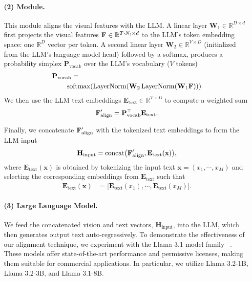 \paragraph{(2) \alignmodule{} Module.}
This module aligns the visual features with the LLM. A linear layer $\mathbf{W}_1 \in \mathbb{R}^{D \times d}$ first projects the visual features $\mathbf{F} \in \mathbb{R}^{T \cdot N_t \times d}$ to the LLM's token embedding space: one $\mathbb{R}^D$ vector per token. A second linear layer $\mathbf{W}_2 \in \mathbb{R}^{V \times D}$ (initialized from the LLM's language-model head) followed by a softmax, produces a probability simplex $\mathbf{P}_\text{vocab}$
over the LLM's vocabulary ($V$ tokens)
\begin{align}
&\mathbf{P}_\text{vocab} = \label{eq:vocab_projection}\\ 
&\qquad\operatorname{softmax}( \operatorname{LayerNorm}(\mathbf{W}_2 \operatorname{LayerNorm}(\mathbf{W}_1 \mathbf{F})))  \nonumber
\end{align}
We then use the LLM text embeddings $\mathbf{E}_\text{text} \in \mathbb{R}^{V \times D}$ to compute a weighted sum
\begin{equation}
\mathbf{F}_\text{align}^\prime = \mathbf{P}_\text{vocab}^\top \mathbf{E}_\text{text}.
\label{eq:feature_alignment}
\end{equation}

Finally, we concatenate $\mathbf{F}_\text{align}^\prime$ with the tokenized text embeddings to form the LLM input
\begin{equation}
\mathbf{H}_\text{input}
= \mathrm{concat}\bigl(\mathbf{F}_\text{align}^\prime, \mathbf{E}_\text{text}(\mathbf{x})\bigr),\nonumber \label{eq:3}
\end{equation}
where $\mathbf{E}_\text{text}(\mathbf{x})$ is obtained by tokenizing the input text $\mathbf{x} = (x_1,\cdots,x_M)$ and selecting the corresponding embeddings from $\mathbf{E}_\text{text}$ such that
\begin{align}
\mathbf{E}_\text{text}(\mathbf{x}) 
& = \bigl[\mathbf{E}_\text{text}(x_1), \cdots, \mathbf{E}_\text{text}(x_M)\bigr].\label{eq:ftext}
\end{align}

\paragraph{(3) Large Language Model.}
We feed the concatenated vision and text vectors, $\mathbf{H}_\text{input}$, into the LLM, which then generates output text auto-regressively. To demonstrate the effectiveness of our alignment technique, we experiment with the Llama 3.1 model family ~\citep{llama3}. These models offer state-of-the-art performance and permissive licenses, making them suitable for commercial applications. In particular, we utilize Llama 3.2-1B, Llama 3.2-3B, and Llama 3.1-8B.




